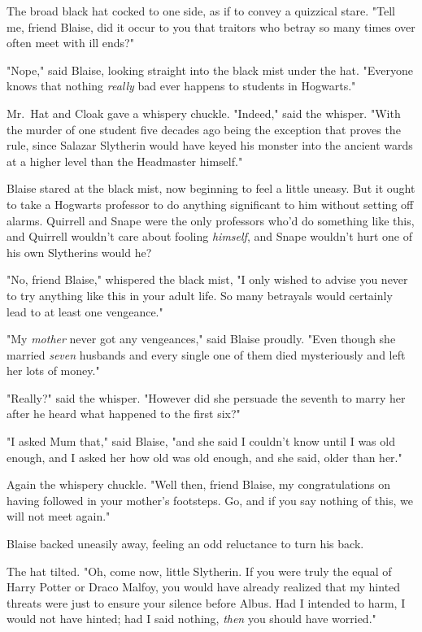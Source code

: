 The broad black hat cocked to one side, as if to convey a quizzical stare.
"Tell me, friend Blaise, did it occur to you that traitors who betray so many
times over often meet with ill ends?"

"Nope," said Blaise, looking straight into the black mist under the hat.
"Everyone knows that nothing \emph{really} bad ever happens to students in
Hogwarts."

Mr.~Hat and Cloak gave a whispery chuckle. "Indeed," said the whisper. "With
the murder of one student five decades ago being the exception that proves the
rule, since Salazar Slytherin would have keyed his monster into the ancient
wards at a higher level than the Headmaster himself."

Blaise stared at the black mist, now beginning to feel a little uneasy. But it
ought to take a Hogwarts professor to do anything significant to him without
setting off alarms. Quirrell and Snape were the only professors who'd do
something like this, and Quirrell wouldn't care about fooling \emph{himself},
and Snape wouldn't hurt one of his own Slytherins{\el} would he?

"No, friend Blaise," whispered the black mist, "I only wished to advise you
never to try anything like this in your adult life. So many betrayals would
certainly lead to at least one vengeance."

"My \emph{mother} never got any vengeances," said Blaise proudly. "Even though
she married \emph{seven} husbands and every single one of them died
mysteriously and left her lots of money."

"Really?" said the whisper. "However did she persuade the seventh to marry her
after he heard what happened to the first six?"

"I asked Mum that," said Blaise, "and she said I couldn't know until I was old
enough, and I asked her how old was old enough, and she said, older than her."

Again the whispery chuckle. "Well then, friend Blaise, my congratulations on
having followed in your mother's footsteps. Go, and if you say nothing of this,
we will not meet again."

Blaise backed uneasily away, feeling an odd reluctance to turn his back.

The hat tilted. "Oh, come now, little Slytherin. If you were truly the equal of
Harry Potter or Draco Malfoy, you would have already realized that my hinted
threats were just to ensure your silence before Albus. Had I intended to harm,
I would not have hinted; had I said nothing, \emph{then} you should have
worried."

